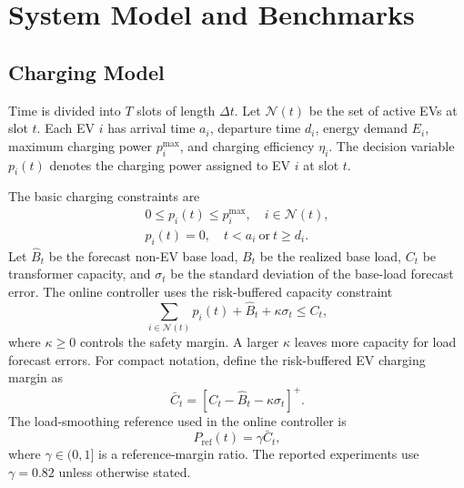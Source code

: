 \documentclass[journal]{IEEEtran}
\begin{document}
\section{System Model and Benchmarks}
\subsection{Charging Model}
Time is divided into $T$ slots of length $\Delta t$. Let $\mathcal{N}(t)$ be the set of active EVs at slot $t$. Each EV $i$ has arrival time $a_i$, departure time $d_i$, energy demand $E_i$, maximum charging power $p_i^{\max}$, and charging efficiency $\eta_i$. The decision variable $p_i(t)$ denotes the charging power assigned to EV $i$ at slot $t$.

The basic charging constraints are
\begin{align}
0 \le p_i(t) \le p_i^{\max}, \quad i\in\mathcal{N}(t), \label{eq:box}\\
p_i(t)=0, \quad t<a_i \ \text{or}\ t\ge d_i . \label{eq:availability}
\end{align}
Let $\hat B_t$ be the forecast non-EV base load, $B_t$ be the realized base load, $C_t$ be transformer capacity, and $\sigma_t$ be the standard deviation of the base-load forecast error. The online controller uses the risk-buffered capacity constraint
\begin{equation}
\sum_{i\in\mathcal{N}(t)} p_i(t)+\hat B_t+\kappa\sigma_t \le C_t ,
\label{eq:risk_capacity}
\end{equation}
where $\kappa\ge0$ controls the safety margin. A larger $\kappa$ leaves more capacity for load forecast errors.
For compact notation, define the risk-buffered EV charging margin as
\begin{equation}
\bar C_t=\left[C_t-\hat B_t-\kappa\sigma_t\right]^+ .
\label{eq:risk_margin}
\end{equation}
The load-smoothing reference used in the online controller is
\begin{equation}
P_{\mathrm{ref}}(t)=\gamma \bar C_t ,
\label{eq:p_ref}
\end{equation}
where $\gamma\in(0,1]$ is a reference-margin ratio. The reported experiments use $\gamma=0.82$ unless otherwise stated.
\end{document}
